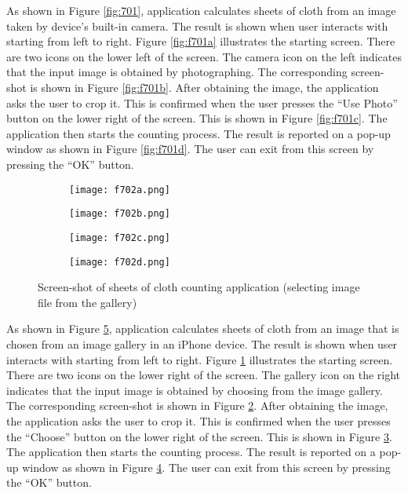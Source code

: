 As shown in Figure \ref{fig:701}, application calculates sheets of cloth from an image taken by device’s built-in camera. The result is shown when user interacts with starting from left to right. Figure \ref{fig:f701a} illustrates the starting screen. There are two icons on the lower left of the screen. The camera icon on the left indicates that the input image is obtained by photographing. The corresponding screen-shot is shown in Figure \ref{fig:f701b}. After obtaining the image, the application asks the user to crop it. This is confirmed when the user presses the “Use Photo” button on the lower right of the screen. This is shown in Figure \ref{fig:f701c}. The application then starts the counting process. The result is reported on a pop-up window as shown in Figure \ref{fig:f701d}. The user can exit from this screen by pressing the “OK” button.
\begin{figure}[t]
	\centering
	\begin{subfigure}[b]{0.2\textwidth}
		\texttt{[image: f702a.png]}
		\caption{}\label{fig:f702a}
	\end{subfigure}
	\begin{subfigure}[b]{0.2\textwidth}
		\texttt{[image: f702b.png]}
		\caption{}\label{fig:f702b}
	\end{subfigure}
	\begin{subfigure}[b]{0.2\textwidth}
		\texttt{[image: f702c.png]}
		\caption{}\label{fig:f702c}
	\end{subfigure}
	\begin{subfigure}[b]{0.2\textwidth}
		\texttt{[image: f702d.png]}
		\caption{}\label{fig:f702d}
	\end{subfigure}
	\caption{Screen-shot of sheets of cloth counting application (selecting image file from the gallery)}
	\label{fig:f702}
\end{figure}

As shown in Figure \ref{fig:f702}, application calculates sheets of cloth from an image that is chosen from an image gallery in an iPhone device. The result is shown when user interacts with starting from left to right. Figure \ref{fig:f702a} illustrates the starting screen. There are two icons on the lower right of the screen. The gallery icon on the right indicates that the input image is obtained by choosing from the image gallery. The corresponding screen-shot is shown in Figure \ref{fig:f702b}. After obtaining the image, the application asks the user to crop it. This is confirmed when the user presses the “Choose” button on the lower right of the screen. This is shown in Figure \ref{fig:f702c}. The application then starts the counting process. The result is reported on a pop-up window as shown in Figure \ref{fig:f702d}. The user can exit from this screen by pressing the “OK” button.

